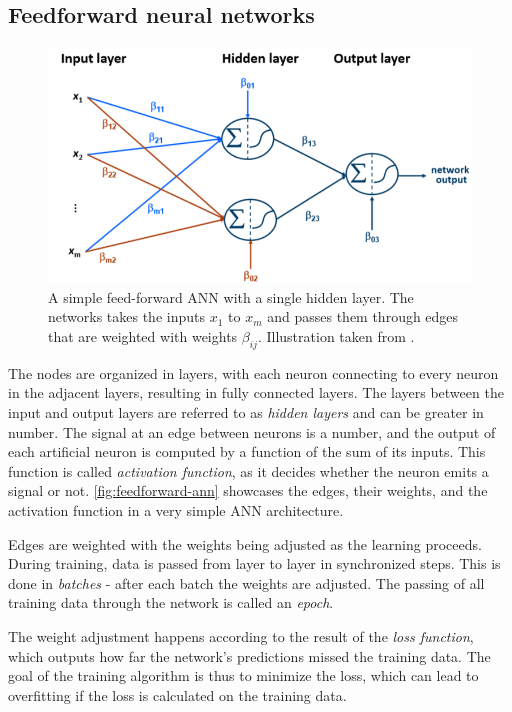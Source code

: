 \subsection{Feedforward neural networks}
\label{sec:feedforward-networks}
\begin{figure}[ht!]
    \centering
    \includegraphics[width=.85\textwidth]{gfx/feedforward-neural-network.png}
    \caption{A simple feed-forward ANN with a single hidden layer. The networks takes the inputs $x_1$ to $x_m$ and passes them through edges that are weighted with weights $\beta_{ij}$. Illustration taken from \cite{lessmannBADS}.}
    \label{fig:feedforward-ann}
\end{figure}

The nodes are organized in layers, with each neuron connecting to every neuron in the adjacent layers, resulting in fully connected layers. The layers between the input and output layers are referred to as \textit{hidden layers} and  can be greater in number. The signal at an edge between neurons is a number, and the output of each artificial neuron is computed by a function of the sum of its inputs. This function is called \textit{activation function}, as it decides whether the neuron emits a signal or not. \autoref{fig:feedforward-ann} showcases the edges, their weights, and the activation function in a very simple ANN architecture.

Edges are weighted with the weights being adjusted as the learning proceeds. During training, data is passed from layer to layer in synchronized steps. This is done in \textit{batches} - after each batch the weights are adjusted. The passing of all training data through the network is called an \textit{epoch}.

The weight adjustment happens according to the result of the \textit{loss function}, which outputs how far the network's predictions missed the training data. The goal of the training algorithm is thus to minimize the loss, which can lead to overfitting if the loss is calculated on the training data.

